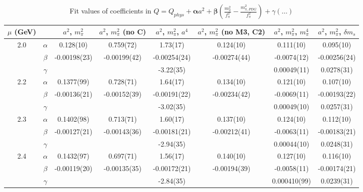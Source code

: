 \documentclass[12pt]{extarticle}
\begin{document}
\begin{table}[h!]
\begin{center}
\begin{tabular}{|c c|c|c|c|c|c|c|}
\hline
$\mu$ (GeV) &  & $a^2$, $m_\pi^2$& $a^2$, $m_\pi^2$ (no C)& $a^2$, $m_\pi^2$, $a^4$& $a^2$, $m_\pi^2$ (no M3, C2)& $a^2$, $m_\pi^2$, $m_\pi^4$& $a^2$, $m_\pi^2$, $\delta m_s$\\
\hline
\multirow{3}{0.5in}{2.0} & $\alpha$ & 0.128(10)& 0.759(72)& 1.73(17)& 0.124(10)& 0.111(10)& 0.095(10)\\
 & $\beta$ & -0.00198(23)& -0.00199(42)& -0.00254(24)& -0.00274(44)& -0.0074(12)& -0.00256(24)\\
 & $\gamma$ &  &  & -3.22(35)&  & 0.00049(11)& 0.0278(31)\\
\hline
\multirow{3}{0.5in}{2.2} & $\alpha$ & 0.1377(99)& 0.728(71)& 1.64(17)& 0.134(10)& 0.121(10)& 0.107(10)\\
 & $\beta$ & -0.00136(21)& -0.00152(39)& -0.00191(22)& -0.00234(42)& -0.0069(11)& -0.00193(22)\\
 & $\gamma$ &  &  & -3.02(35)&  & 0.00049(10)& 0.0257(31)\\
\hline
\multirow{3}{0.5in}{2.3} & $\alpha$ & 0.1402(98)& 0.713(71)& 1.60(17)& 0.137(10)& 0.124(10)& 0.112(10)\\
 & $\beta$ & -0.00127(21)& -0.00143(36)& -0.00181(21)& -0.00212(41)& -0.0063(11)& -0.00183(21)\\
 & $\gamma$ &  &  & -2.94(35)&  & 0.00044(10)& 0.0248(31)\\
\hline
\multirow{3}{0.5in}{2.4} & $\alpha$ & 0.1432(97)& 0.697(71)& 1.56(17)& 0.140(10)& 0.127(10)& 0.116(10)\\
 & $\beta$ & -0.00119(20)& -0.00135(35)& -0.00172(21)& -0.00194(39)& -0.0058(11)& -0.00174(21)\\
 & $\gamma$ &  &  & -2.84(35)&  & 0.000410(99)& 0.0239(31)\\
\hline
\end{tabular}
\caption{Fit values of coefficients in $Q = Q_{phys} + \mathbf{\alpha} a^2 + \mathbf{\beta}\left(\frac{m_\pi^2}{f_\pi^2}-\frac{m_{\pi,PDG}^2}{f_\pi^2}\right) + \gamma(\ldots)$}
\end{center}
\end{table}






\end{document}
